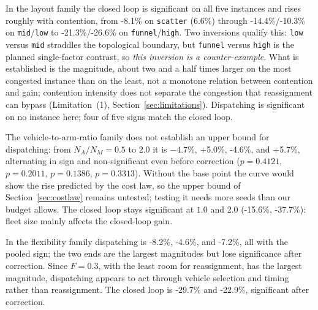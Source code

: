 \documentclass[preprint,review,12pt,authoryear]{elsarticle}
\newcommand{\GainProbeStarve}{4.7\%}     %
\newcommand{\GainProbeFleetBase}{-4.6\%} %
\newcommand{\GainProbeFleetOne}{+5.0\%}  %
\newcommand{\GainProbeFleetTwo}{+5.7\%}  %
\newcommand{\GainLoopFunnel}{-21.3\%}    %
\newcommand{\GainLoopHigh}{-26.6\%}      %
\newcommand{\GainLoopMid}{-14.4\%}       %
\newcommand{\GainLoopLow}{-10.3\%}       %
\newcommand{\GainLoopScatter}{-8.1\%}    %
\newcommand{\GainLoopFleetOne}{-15.6\%}  %
\newcommand{\GainLoopFleetTwo}{-37.7\%}  %
\newcommand{\GainLoopFlexLo}{-29.7\%}    %
\newcommand{\GainLoopFlexHi}{-22.9\%}    %
\newcommand{\GainProbeFlexLo}{-8.2\%}    %
\newcommand{\GainProbeFlexHi}{-7.2\%}    %
\newcommand{\PProbeFleetHalfRaw}{=0.4121}
\newcommand{\PProbeFleetOneRaw}{=0.2011}
\newcommand{\PProbeFleetBaseRaw}{=0.1386}
\newcommand{\PProbeFleetTwoRaw}{=0.3313}
\newcommand{\ContentionLo}{6.6\%}
\begin{document}
In the layout family the closed loop is significant on all five instances and rises roughly with contention, from \GainLoopScatter{} on \texttt{scatter} (\ContentionLo{}) through \GainLoopMid{}/\GainLoopLow{} on \texttt{mid}/\texttt{low} to \GainLoopFunnel{}/\GainLoopHigh{} on \texttt{funnel}/\texttt{high}.
Two inversions qualify this: \texttt{low} versus \texttt{mid} straddles the topological boundary, but \texttt{funnel} versus \texttt{high} is the planned single-factor contrast, so \emph{this inversion is a counter-example}.
What is established is the magnitude, about two and a half times larger on the most congested instance than on the least, not a monotone relation between contention and gain; contention intensity does not separate the congestion that reassignment can bypass (Limitation~(1), Section~\ref{sec:limitations}).
Dispatching is significant on no instance here; four of five signs match the closed loop.

The vehicle-to-arm-ratio family does not establish an upper bound for dispatching: from $N_A/N_M=0.5$ to $2.0$ it is $-\GainProbeStarve$, \GainProbeFleetOne{}, \GainProbeFleetBase{}, and \GainProbeFleetTwo{}, alternating in sign and non-significant even before correction ($p\PProbeFleetHalfRaw$, $p\PProbeFleetOneRaw$, $p\PProbeFleetBaseRaw$, $p\PProbeFleetTwoRaw$).
Without the base point the curve would show the rise predicted by the cost law, so the upper bound of Section~\ref{sec:costlaw} remains untested; testing it needs more seeds than our budget allows.
The closed loop stays significant at $1.0$ and $2.0$ (\GainLoopFleetOne{}, \GainLoopFleetTwo{}): fleet size mainly affects the closed-loop gain.

In the flexibility family dispatching is \GainProbeFlexLo{}, \GainProbeFleetBase{}, and \GainProbeFlexHi{}, all with the pooled sign; the two ends are the largest magnitudes but lose significance after correction.
Since $F=0.3$, with the least room for reassignment, has the largest magnitude, dispatching appears to act through vehicle selection and timing rather than reassignment.
The closed loop is \GainLoopFlexLo{} and \GainLoopFlexHi{}, significant after correction.
\end{document}
